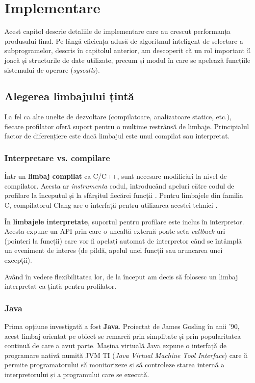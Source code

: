 \chapter{Implementare}

Acest capitol descrie detaliile de implementare care au crescut performanța produsului final. Pe lângă eficiența adusă de algoritmul inteligent de selectare a subprogramelor, descris în capitolul anterior, am descoperit că un rol important îl joacă și structurile de date utilizate, precum și modul în care se apelează funcțiile sistemului de operare (\emph{syscalls}).

\section{Alegerea limbajului țintă}

La fel ca alte unelte de dezvoltare (compilatoare, analizatoare statice, etc.), fiecare profilator oferă suport pentru o mulțime restrânsă de limbaje. Principialul factor de diferențiere este dacă limbajul este unul compilat sau interpretat.

\subsection*{Interpretare vs. compilare}

Într-un \textbf{limbaj compilat} ca C/C++, sunt necesare modificări la nivel de compilator. Acesta ar \emph{instrumenta} codul, introducând apeluri către codul de profilare la începutul și la sfârșitul fiecărei funcții \cite{instrumentation_framework}. Pentru limbajele din familia C, compilatorul Clang are o interfață pentru utilizarea acestei tehnici \cite{clang_instrumented_profiling}.

În \textbf{limbajele interpretate}, suportul pentru profilare este inclus în interpretor. Acesta expune un API prin care o unealtă externă poate seta \textit{callback}-uri (pointeri la funcții) care vor fi apelați automat de interpretor când se întâmplă un eveniment de interes (de pildă, apelul unei funcții sau aruncarea unei excepții).

Având în vedere flexibilitatea lor, de la început am decis să folosesc un limbaj interpretat ca țintă pentru profilator.

\subsection*{Java}

Prima opțiune investigată a fost \textbf{Java}. Proiectat de James Gosling în anii '90, acest limbaj orientat pe obiect se remarcă prin simplitate și prin popularitatea continuă de care a avut parte. Mașina virtuală Java expune o interfață de programare nativă numită JVM TI (\textit{Java Virtual Machine Tool Interface}) care îi permite programatorului să monitorizeze și să controleze starea internă a interpretorului și a programului care se execută.

